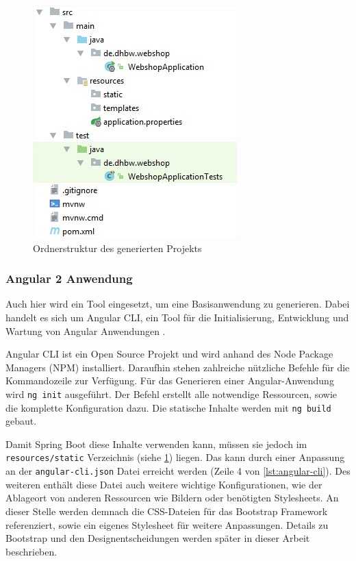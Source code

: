 \begin{figure}[th!]
	\centering
	\includegraphics[width=0.5\linewidth]{bilder/kap7/init-project}
	\caption{Ordnerstruktur des generierten Projekts}
	\label{fig:init-project}
\end{figure}

\subsubsection{Angular 2 Anwendung}\label{angular_setup}
Auch hier wird ein Tool eingesetzt, um eine Basisanwendung zu generieren. Dabei handelt es sich um Angular CLI, ein Tool für die Initialisierung, Entwicklung und Wartung von Angular Anwendungen \cite{Arora2017}.

Angular CLI ist ein Open Source Projekt und wird anhand des Node Package Managers (\acs{NPM}) installiert.
Daraufhin stehen zahlreiche nützliche Befehle für die Kommandozeile zur Verfügung.
Für das Generieren einer Angular-Anwendung wird \texttt{ng init} ausgeführt. Der Befehl erstellt alle notwendige Ressourcen, sowie die komplette Konfiguration dazu.
Die statische Inhalte werden mit \texttt{ng build} gebaut.

Damit Spring Boot diese Inhalte verwenden kann, müssen sie jedoch im  \texttt{resources/static} Verzeichnis (siehe \cref{fig:init-project}) liegen.
Das kann durch einer Anpassung an der \texttt{angular-cli.json} Datei erreicht werden (Zeile 4 von \cref{lst:angular-cli}).
Des weiteren enthält diese Datei auch weitere wichtige Konfigurationen, wie der Ablageort von anderen Ressourcen wie Bildern oder benötigten Stylesheets.
An dieser Stelle werden demnach die \acs{CSS}-Dateien für das Bootstrap Framework referenziert, sowie ein eigenes Stylesheet für weitere Anpassungen.
Details zu Bootstrap und den Designentscheidungen werden später in dieser Arbeit beschrieben.
\\



